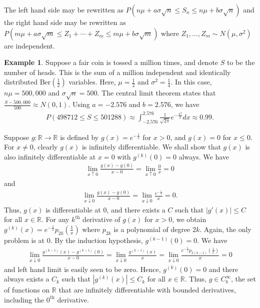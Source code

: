 \documentclass[15pt,a4paper]{book}
\theoremstyle{definition}
\newtheorem{example}[theorem]{Example}
\newcommand{\abs}[1]{\left| #1 \right|} %
\newcommand{\R}{\mathbb{R}}
\begin{document}
The left hand side may be rewritten as $P(n\mu + a\sigma\sqrt{n} \leq S_{n} \leq n\mu + b\sigma\sqrt{n})$ and the right hand side may be rewritten as $P(m\mu + a\sigma\sqrt{m} \leq Z_{1} + \cdots + Z_{m} \leq m\mu + b\sigma\sqrt{m})$ where $Z_{1},\ldots,Z_{m} \sim N(\mu,\sigma^{2})$ are independent.

\begin{example}
    Suppose a fair coin is tossed a million times, and denote $S$ to be the number of heads. This is the sum of a million independent and identically distributed $\text{Ber}(\frac{1}{2})$ variables. Here, $\mu = \frac{1}{2}$ and $\sigma^{2} = \frac{1}{4}$. In this case, $n\mu = 500,000$ and $\sigma \sqrt{n} = 500$. The central limit theorem states that $\frac{S-500,000}{500} \approx N(0,1)$. Using $a = -2.576$ and $b = 2.576$, we have
    \begin{align}
        P(498712 \leq S \leq 501288) \approx \int_{-2.576}^{2.576} \frac{1}{\sqrt{2\pi}} e^{-\frac{x^{2}}{2}}dx \approx 0.99.
    \end{align}
\end{example}

Suppose $g:\R \to \R$ is defined by $g(x) = e^{-\frac{1}{x}}$ for $x > 0$, and $g(x) = 0$ for $x \leq 0$. For $x \neq 0$, clearly $g(x)$ is infinitely differentiable. We shall show that $g(x)$ is also infinitely differentiable at $x = 0$ with $g^{(k)}(0) = 0$ always. We have
\begin{align}
    \lim_{x \uparrow 0} \frac{g(x)-g(0)}{x-0} = \lim_{x \uparrow 0} \frac{0}{x} = 0
\end{align}
and
\begin{align}
    \lim_{x \downarrow 0} \frac{g(x)-g(0)}{x-0} = \lim_{x \downarrow 0} \frac{e^{-\frac{1}{x}}}{x} = 0.
\end{align}
Thus, $g(x)$ is differentiable at $0$, and there exists a $C$ such that $\abs{g'(x)} \leq C$ for all $x \in \R$. For any $k^{\text{th}}$ derivative of $g(x)$ for $x > 0$, we obtain $g^{(k)}(x) = e^{-\frac{1}{x}}p_{2k}(\frac{1}{x})$ where $p_{2k}$ is a polynomial of degree $2k$. Again, the only problem is at 0. By the induction hypothesis, $g^{(k-1)}(0) = 0$. We have
\begin{align}
    \lim_{x \downarrow 0} \frac{g^{(k-1)}(x)-g^{(k-1)}(0)}{x-0} = \lim_{x \downarrow 0} \frac{g^{(k-1)}(x)}{x} = \lim_{x \downarrow 0} \frac{e^{-\frac{1}{x}} p_{2(k-1)}(\frac{1}{x})}{x} = 0
\end{align}
and left hand limit is easily seen to be zero. Hence, $g^{(k)}(0) = 0$ and there always exists a $C_{k}$ such that $\abs{g^{(k)}(x)} \leq C_{k}$ for all $x \in \R$. Thus, $g \in C_{b}^{\infty}$, the set of functions on $\R$ that are infinitely differentiable with bounded derivatives, including the $0^{\text{th}}$ derivative.
\end{document}
